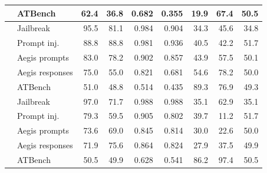 \begin{table}[t]
\begin{tabular}{@{}llrrrrrrr@{}}
 & ATBench & 62.4 & 36.8 & 0.682 & 0.355 & 19.9 & 67.4 & 50.5 \\
\midrule
{} & Jailbreak & 95.5 & 81.1 & 0.984 & 0.904 & 34.3 & 45.6 & 34.8 \\
 & Prompt inj. & 88.8 & 88.8 & 0.981 & 0.936 & 40.5 & 42.2 & 51.7 \\
 & Aegis prompts & 83.0 & 78.2 & 0.902 & 0.857 & 43.9 & 57.5 & 50.1 \\
 & Aegis responses & 75.0 & 55.0 & 0.821 & 0.681 & 54.6 & 78.2 & 50.0 \\
 & ATBench & 51.0 & 48.8 & 0.514 & 0.435 & 89.3 & 76.9 & 49.3 \\
\midrule
{} & Jailbreak & 97.0 & 71.7 & 0.988 & 0.988 & 35.1 & 62.9 & 35.1 \\
 & Prompt inj. & 79.3 & 59.5 & 0.905 & 0.802 & 39.7 & 11.2 & 51.7 \\
 & Aegis prompts & 73.6 & 69.0 & 0.845 & 0.814 & 30.0 & 22.6 & 50.0 \\
 & Aegis responses & 71.9 & 75.6 & 0.864 & 0.824 & 27.9 & 37.5 & 49.9 \\
 & ATBench & 50.5 & 49.9 & 0.628 & 0.541 & 86.2 & 97.4 & 50.5 \\
\bottomrule
\end{tabular}
\end{table}
